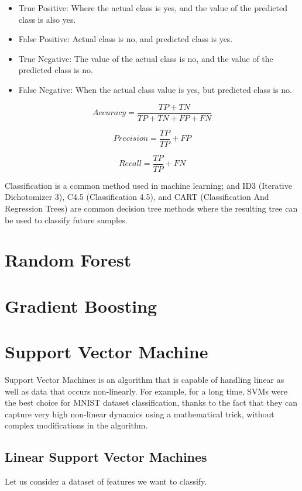 \documentclass[12pt]{article}
\begin{document}
\begin{itemize}

\item{True Positive}: Where the actual class is yes, and
the value of the predicted class is also yes.

\item{False Positive}: Actual class is no, and predicted
class is yes.

\item{True Negative}: The value of the actual class is no,
and the value of the predicted class is no.

\item{False Negative}: When the actual class value is yes,
but predicted class is no.

\end{itemize}

$$
Accuracy= \frac{TP + TN}{TP + TN + FP + FN}
$$

$$
Precision = \frac{TP}{TP} + FP
$$

$$
Recall = \frac{TP}{TP} + FN
$$

Classification is a common method used in machine learning; and ID3 (Iterative Dichotomizer 3), C4.5 (Classification 4.5), and CART
(Classification And Regression Trees) are common decision tree methods where the resulting tree can be used to classify future samples.
\newpage
\section{Random Forest}

\newpage
\section{Gradient Boosting}

\newpage
\section{Support Vector Machine}
Support Vector Machines is an algorithm that is capable of handling 
linear as well as data that occurs non-linearly. For example, for a long time, SVMs were the best
choice for MNIST dataset classification, thanks to the fact that they can capture very high
non-linear dynamics using a mathematical trick, without complex modifications in the
algorithm.

\subsection{Linear Support Vector Machines}
Let us consider a dataset of features we want to classify.
\end{document}
